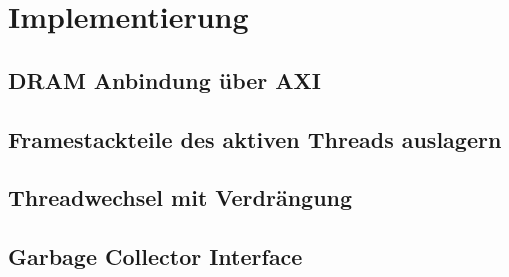 \chapter{Implementierung}
\label{cha:Implementierung}
\section{DRAM Anbindung über AXI}
\section{Framestackteile des aktiven Threads auslagern}
\section{Threadwechsel mit Verdrängung}
\section{Garbage Collector Interface}